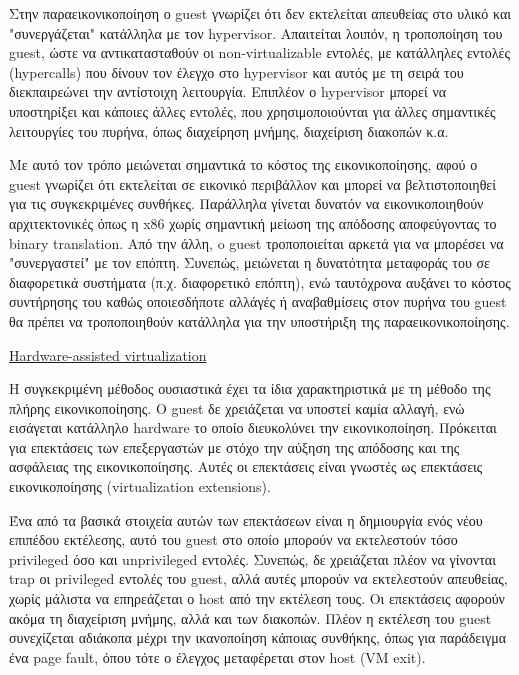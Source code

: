 Στην παραεικονικοποίηση ο guest γνωρίζει ότι δεν εκτελείται απευθείας στο υλικό
και "συνεργάζεται" κατάλληλα με τον hypervisor. Απαιτείται λοιπόν, η τροποποίηση
του guest, ώστε να αντικατασταθούν οι non-virtualizable εντολές, με κατάλληλες
εντολές (hypercalls) που δίνουν τον έλεγχο στο hypervisor και αυτός με τη σειρά του διεκπαιρεώνει την αντίστοιχη λειτουργία. Επιπλέον ο hypervisor μπορεί να
υποστηρίξει και κάποιες άλλες εντολές, που χρησιμοποιούνται για άλλες σημαντικές
λειτουργίες του πυρήνα, όπως διαχείρηση μνήμης, διαχείριση διακοπών κ.α. 

Με αυτό τον τρόπο μειώνεται σημαντικά το κόστος της εικονικοποίησης, αφού ο
guest γνωρίζει ότι εκτελείται σε εικονικό περιβάλλον και μπορεί να
βελτιστοποιηθεί για τις συγκεκριμένες συνθήκες. Παράλληλα γίνεται
δυνατόν να εικονικοποιηθούν αρχιτεκτονικές όπως η x86 χωρίς σημαντική μείωση
της απόδοσης αποφεύγοντας το binary translation. Από την άλλη, o guest
τροποποιείται αρκετά για να μπορέσει να "συνεργαστεί" με τον επόπτη. Συνεπώς, 
μειώνεται η δυνατότητα μεταφοράς του σε διαφορετικά συστήματα (π.χ. διαφορετικό
επόπτη), ενώ ταυτόχρονα αυξάνει το κόστος συντήρησης του καθώς οποιεσδήποτε
αλλάγές ή αναβαθμίσεις στον πυρήνα του guest θα πρέπει να τροποποιηθούν
κατάλληλα για την υποστήριξη της παραεικονικοποίησης.

\vspace{2ex}
\underline{Hardware-assisted virtualization}

\vspace{1ex}

Η συγκεκριμένη μέθοδος ουσιαστικά έχει τα ίδια χαρακτηριστικά με τη μέθοδο της
πλήρης εικονικοποίησης. Ο guest δε χρειάζεται να υποστεί καμία αλλαγή, ενώ
εισάγεται κατάλληλο hardware το οποίο διευκολύνει την εικονικοποίηση. Πρόκειται
για επεκτάσεις των επεξεργαστών με στόχο την αύξηση της απόδοσης και της
ασφάλειας της εικονικοποίησης. Αυτές οι επεκτάσεις είναι γνωστές ως επεκτάσεις
εικονικοποίησης (virtualization extensions). 

Ένα από τα βασικά στοιχεία αυτών των επεκτάσεων είναι η δημιουργία ενός νέου
επιπέδου εκτέλεσης, αυτό του guest στο οποίο μπορούν να εκτελεστούν τόσο
privileged όσο και unprivileged εντολές. Συνεπώς, δε χρειάζεται πλέον να
γίνονται trap οι privileged εντολές του guest, αλλά αυτές μπορούν να εκτελεστούν
απευθείας, χωρίς μάλιστα να επηρεάζεται ο host από την εκτέλεση τους. Οι
επεκτάσεις αφορούν ακόμα τη διαχείριση μνήμης, αλλά και των διακοπών. Πλέον η
εκτέλεση του guest συνεχίζεται αδιάκοπα μέχρι την ικανοποίηση κάποιας συνθήκης,
όπως για παράδειγμα ένα page fault, όπου τότε ο έλεγχος μεταφέρεται στον host
(VM exit). 

